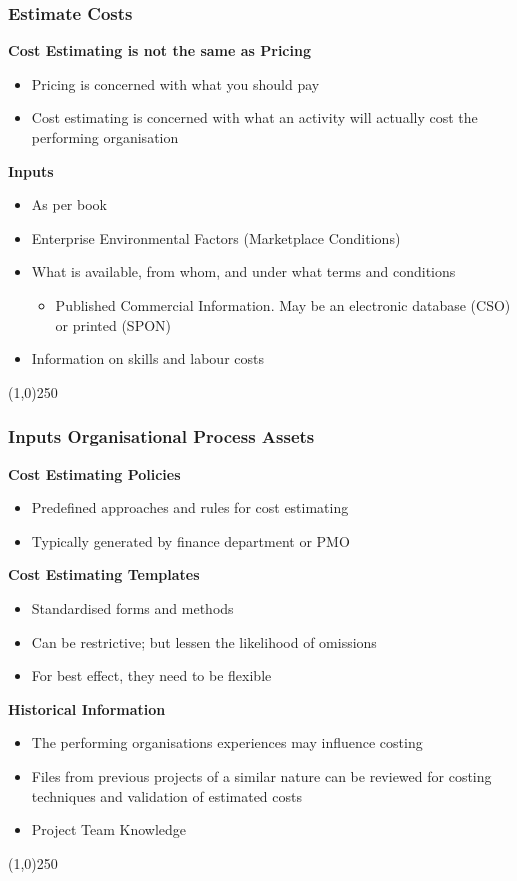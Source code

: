 \begin{frame}
\frametitle{Estimate Costs}
\textbf{Cost Estimating is not the same as Pricing}\\
\begin{itemize}
	\item Pricing is concerned with what you should pay
	\item Cost estimating is concerned with what an activity will actually cost the performing organisation
\end{itemize}
\textbf{Inputs}\\
\begin{itemize}
	\item As per book
	\item Enterprise Environmental Factors (Marketplace Conditions)
	\item What is available, from whom, and under what terms and conditions
	\begin{itemize}
		\item Published Commercial Information. May be an electronic database (CSO) or printed (SPON)
	\end{itemize}
	\item Information on skills and labour costs
\end{itemize}
\end{frame}
\begin{center}\line(1,0){250}\end{center}









\begin{frame}
\frametitle{Inputs \hfill Organisational Process Assets}
\textbf{Cost Estimating Policies}
\begin{itemize}
	\item Predefined approaches and rules for cost estimating
	\item Typically generated by finance department or PMO
\end{itemize}
\textbf{Cost Estimating Templates}
\begin{itemize}
	\item Standardised forms and methods
	\item Can be restrictive; but lessen the likelihood of omissions
	\item For best effect, they need to be flexible
\end{itemize}
\textbf{Historical Information}
\begin{itemize}
	\item The performing organisations experiences may influence costing
	\item Files from previous projects of a similar nature can be reviewed for costing techniques and validation of estimated costs
	\item Project Team Knowledge
\end{itemize}
\end{frame}
\begin{center}\line(1,0){250}\end{center}









